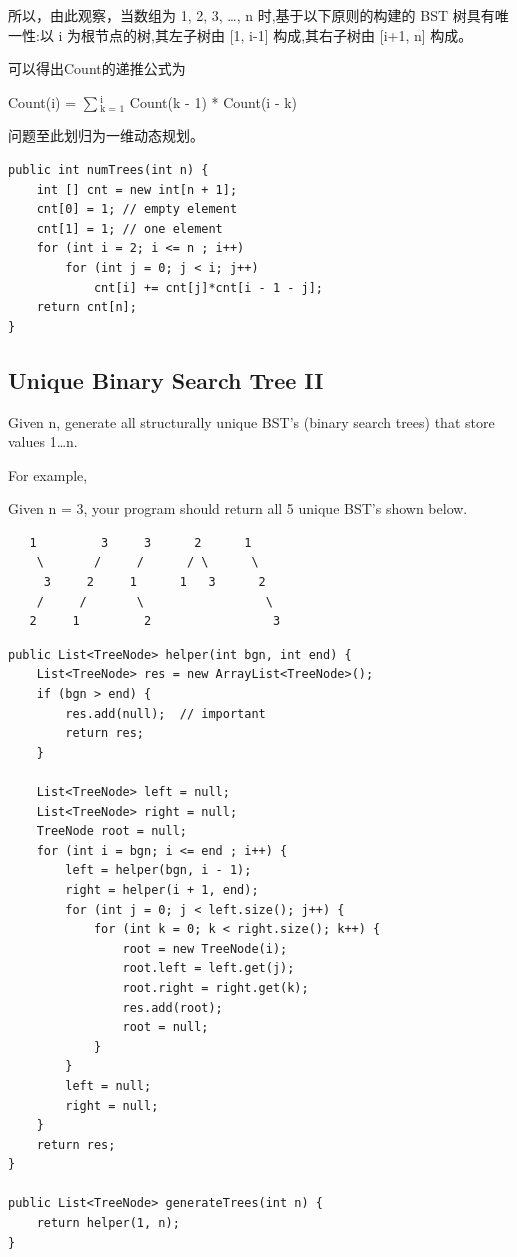 \documentclass[12pt]{book}
\begin{document}
所以，由此观察，当数组为 1, 2, 3, \ldots{}, n 时,基于以下原则的构建的 BST 树具有唯一性:以 i 为根节点的树,其左子树由 [1, i-1] 构成,其右子树由 [i+1, n] 构成。

可以得出Count的递推公式为

Count(i) = $\sum$$_{\text{k = 1}}^{\text{i}}$ Count(k - 1) * Count(i - k) 

问题至此划归为一维动态规划。
\lstset{language=java,label= ,caption= ,numbers=none}
\begin{lstlisting}
public int numTrees(int n) {
    int [] cnt = new int[n + 1];
    cnt[0] = 1; // empty element
    cnt[1] = 1; // one element
    for (int i = 2; i <= n ; i++) 
        for (int j = 0; j < i; j++) 
            cnt[i] += cnt[j]*cnt[i - 1 - j];
    return cnt[n];
}
\end{lstlisting}
\subsection{Unique Binary Search Tree II}
\label{sec-14-2-5}
Given n, generate all structurally unique BST's (binary search trees) that store values 1\ldots{}n.

For example,

Given n = 3, your program should return all 5 unique BST's shown below.
\lstset{language=java,label= ,caption= ,numbers=none}
\begin{lstlisting}
   1         3     3      2      1
    \       /     /      / \      \
     3     2     1      1   3      2
    /     /       \                 \
   2     1         2                 3
\end{lstlisting}
\lstset{language=java,label= ,caption= ,numbers=none}
\begin{lstlisting}
public List<TreeNode> helper(int bgn, int end) {
    List<TreeNode> res = new ArrayList<TreeNode>();
    if (bgn > end) {
        res.add(null);  // important
        return res;
    }

    List<TreeNode> left = null;
    List<TreeNode> right = null;
    TreeNode root = null;
    for (int i = bgn; i <= end ; i++) {
        left = helper(bgn, i - 1);
        right = helper(i + 1, end);
        for (int j = 0; j < left.size(); j++) {
            for (int k = 0; k < right.size(); k++) {
                root = new TreeNode(i);
                root.left = left.get(j);
                root.right = right.get(k);
                res.add(root);
                root = null;
            }
        }
        left = null;
        right = null;
    }
    return res;
}
        
public List<TreeNode> generateTrees(int n) {
    return helper(1, n);
}
\end{lstlisting}
\end{document}
